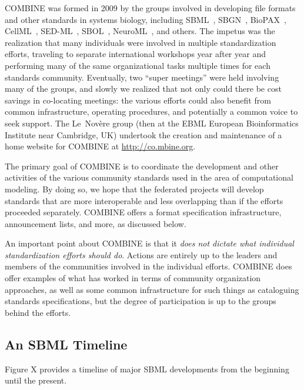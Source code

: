 COMBINE was formed in 2009 by the groups involved in developing file formats and other standards in systems biology, including SBML~\cite{hucka_2003, hucka_2004, hucka_2010}, SBGN~\cite{lenovere_2009}, BioPAX~\cite{demir_2010}, CellML~\cite{cuellar_2003, hedley_2001b}, SED-ML~\cite{waltemath_2011, springerlink:10.1007/978354088562715}, SBOL~\cite{galdzicki_2014}, NeuroML~\cite{gleeson_2010, neuroml_2014}, and others.  The impetus was the realization that many individuals were involved in multiple standardization efforts, traveling to separate international workshops year after year and performing many of the same organizational tasks multiple times for each standards community.  Eventually, two ``super meetings'' were held involving many of the groups, and slowly we realized that not only could there be cost savings in co-locating meetings: the various efforts could also benefit from common infrastructure, operating procedures, and potentially a common voice to seek support.  The Le~Nov\`{e}re group (then at the EBML European Bioinformatics Institute near Cambridge, UK) undertook the creation and maintenance of a home website for COMBINE at \url{http://co.mbine.org}.

The primary goal of COMBINE is to coordinate the development and other activities of the various community standards used in the area of computational modeling.  By doing so, we hope that the federated projects will develop standards that are more interoperable and less overlapping than if the efforts proceeded separately.  COMBINE offers a format specification infrastructure, announcement lists, and more, as discussed below.

An important point about COMBINE is that it \emph{does not dictate what individual standardization efforts should do}.  Actions are entirely up to the leaders and members of the communities involved in the individual efforts.  COMBINE does offer examples of what has worked in terms of community organization approaches, as well as some common infrastructure for such things as cataloguing standards specifications, but the degree of participation is up to the groups behind the efforts.

\clearpage

\subsection{An SBML Timeline}

Figure X provides a timeline of major SBML developments from the beginning until the present. 


